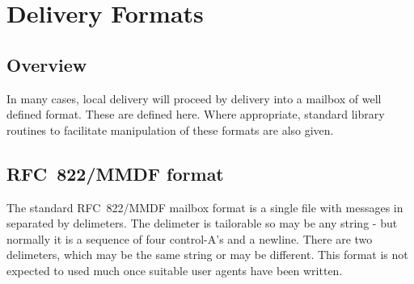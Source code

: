 \chapter {Delivery Formats}

\section {Overview}

In many cases, local delivery will proceed by delivery into a mailbox of
well defined format.  These are defined here.  Where appropriate, standard
library routines to facilitate manipulation of these formats are also given.

\section {RFC~822/MMDF format}

The standard RFC~822/MMDF mailbox format is a single file with
messages in separated by delimeters. The delimeter is tailorable so
may be any string - but normally it is a sequence of four control-A's
and a newline. There are two delimeters, which may be the same string
or may be different. This format is not expected to used much once
suitable user agents have been written.
